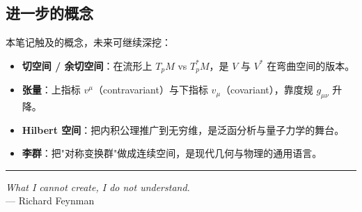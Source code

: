 \documentclass[11pt,a4paper]{article}
\begin{document}
\subsection{进一步的概念}
本笔记触及的概念，未来可继续深挖：
\begin{itemize}
    \item \textbf{切空间 / 余切空间}：在流形上 $T_pM$ vs $T_p^*M$，是 $V$ 与 $V^*$ 在弯曲空间的版本。
    \item \textbf{张量}：上指标 $v^\mu$（contravariant）与下指标 $v_\mu$（covariant），靠度规 $g_{\mu\nu}$ 升降。
    \item \textbf{Hilbert 空间}：把内积公理推广到无穷维，是泛函分析与量子力学的舞台。
    \item \textbf{李群}：把"对称变换群"做成连续空间，是现代几何与物理的通用语言。
\end{itemize}

\bigskip
\hrule
\bigskip

\begin{flushright}
    \textit{What I cannot create, I do not understand.}\\
    — Richard Feynman
\end{flushright}
\end{document}

